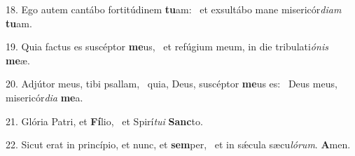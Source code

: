 18. Ego autem cantábo fortitúdinem \textbf{tu}am: \ast\  et exsultábo mane misericór\textit{di}\textit{am} \textbf{tu}am.\

19. Quia factus es suscéptor \textbf{me}us, \ast\  et refúgium meum, in die tribulati\textit{ó}\textit{nis} \textbf{me}æ.\

20. Adjútor meus, tibi psallam, \dag\  quia, Deus, suscéptor \textbf{me}us es: \ast\  Deus meus, misericór\textit{di}\textit{a} \textbf{me}a.\

21. Glória Patri, et \textbf{Fí}lio, \ast\  et Spirí\textit{tu}\textit{i} \textbf{Sanc}to.\

22. Sicut erat in princípio, et nunc, et \textbf{sem}per, \ast\  et in sǽcula sæcu\textit{ló}\textit{rum}. \textbf{A}men.\

